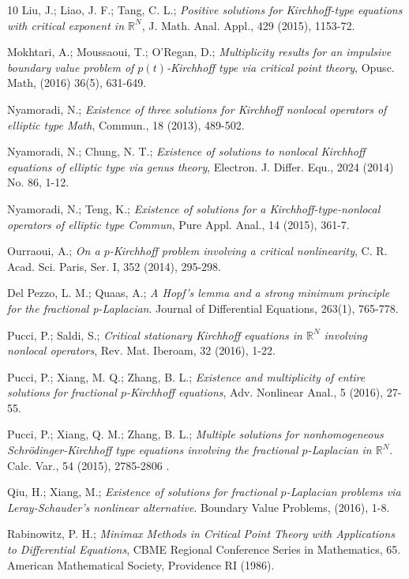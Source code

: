\documentclass[reqno]{amsart}
\begin{document}
\begin{thebibliography}{10}
 Liu, J.;  Liao, J. F.;  Tang, C. L.;
 \emph{Positive  solutions  for  Kirchhoff-type  equations  with  critical  
 exponent in $\mathbb{R}^N$}, J. Math. Anal. Appl., 429 (2015), 1153-72.

  Mokhtari, A.; Moussaoui, T.;  O'Regan, D.;
\emph{Multiplicity results for an impulsive boundary value problem of 
$p(t)$-Kirchhoff type via critical point theory}, Opusc. Math, (2016) 36(5), 631-649.

 Nyamoradi, N.;
\emph{Existence of three solutions for Kirchhoff nonlocal operators of elliptic 
type Math}, Commun., 18 (2013), 489-502.

 Nyamoradi, N.; Chung,  N. T.;
\emph{Existence  of  solutions  to  nonlocal  Kirchhoff  equations  of  elliptic 
type via genus theory}, Electron. J. Differ. Equ., 2024 (2014) No. 86, 1-12.

 Nyamoradi, N.; Teng, K.;
\emph{Existence of solutions for a Kirchhoff-type-nonlocal operators of elliptic 
type Commun}, Pure Appl. Anal., 14 (2015), 361-7.

 Ourraoui, A.;
\emph{On a $p$-Kirchhoff problem involving a critical nonlinearity}, 
C. R. Acad. Sci. Paris, Ser. I, 352 (2014), 295-298.

 Del Pezzo, L. M.; Quaas, A.;
\emph{A Hopf's lemma and a strong minimum principle for the fractional p-Laplacian}. 
Journal of Differential Equations, 263(1), 765-778.

 Pucci, P.; Saldi, S.;
\emph{Critical stationary Kirchhoff equations in $\mathbb{R}^N$ involving nonlocal operators},
Rev. Mat. Iberoam, 32 (2016), 1-22.

 Pucci, P.; Xiang, M. Q.; Zhang, B. L.;
\emph{Existence and multiplicity of entire solutions for fractional $p$-Kirchhoff 
equations}, Adv. Nonlinear Anal., 5 (2016), 27-55.

 Pucci, P.; Xiang, Q. M.; Zhang, B. L.;
\emph{Multiple solutions for nonhomogeneous Schr\"odinger-Kirchhoff type equations 
involving the fractional $p$-Laplacian in $\mathbb{R}^N$}. Calc. Var., 54 (2015), 2785-2806 .

 Qiu, H.;  Xiang, M.;
\emph{Existence  of  solutions  for  fractional $p$-Laplacian  problems  via  
Leray-Schauder's nonlinear alternative}. Boundary Value Problems, (2016), 1-8.

 Rabinowitz, P. H.;
\emph{Minimax Methods in Critical Point Theory with Applications to Differential 
Equations}, CBME Regional Conference Series in Mathematics, 65. 
American Mathematical Society, Providence RI (1986).


\end{thebibliography}
\end{document}
